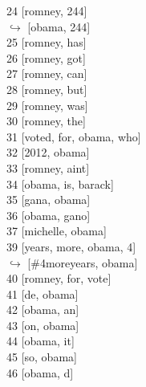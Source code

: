 \documentclass[letterpaper,12pt,titlepage,oneside,final]{book}
\begin{document}
\begin{figure}[h]
\begin{minipage}[t]{0.33\textwidth}
     
     24 [romney, 244] \\
       $\hookrightarrow$  [obama, 244] \\
     25 [romney, has] \\
     26 [romney, got] \\
     27 [romney, can] \\
     28 [romney, but] \\
     29 [romney, was] \\
     30 [romney, the] \\
     31 [voted, for, obama, who] \\
     32 [2012, obama] \\
     33 [romney, aint] \\
     34 [obama, is, barack] \\
     35 [gana, obama] \\
     36 [obama, gano] \\
   37  [michelle, obama] \\
  39 [years, more, obama, 4] \\
   $\hookrightarrow$  [\#4moreyears, obama] \\
     40 [romney, for, vote] \\ 
     41 [de, obama] \\
     42 [obama, an] \\
     43 [on, obama] \\
     44 [obama, it] \\
     45 [so, obama] \\
     46 [obama, d] 
         
\end{minipage}
\begin{minipage}[t]{0.3\textwidth}


\end{minipage}
\end{figure}
\end{document}
